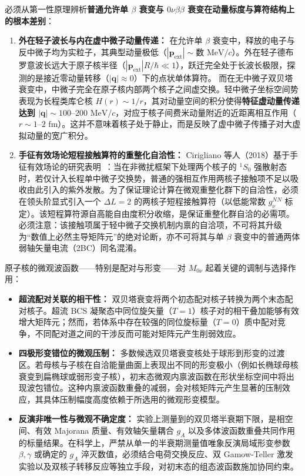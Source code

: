 必须从第一性原理辨析\textbf{普通允许单 $\beta$ 衰变与 $0\nu\beta\beta$ 衰变在动量标度与算符结构上的根本差别}：
\begin{enumerate}
\item \textbf{外在轻子波长与内在虚中微子动量传递：}
在允许单 $\beta$ 衰变中，释放的电子与反中微子均为实粒子，其典型动量极低（$|\mathbf{p}_{\mathrm{ext}}| \sim \text{数 MeV}/c$）。外在轻子德布罗意波长远大于原子核半径（$|\mathbf{p}_{\mathrm{ext}}| R / \hbar \ll 1$），跃迁完全处于长波长极限，探测的是接近零动量转移（$|\mathbf{q}| \approx 0$）下的点状单体算符。
而在无中微子双贝塔衰变中，中微子完全在原子核内部两个核子之间虚交换。轻中微子坐标空间势表现为长程类库仑核 $H(r) \sim 1/r$，其对动量空间的积分使得\textbf{特征虚动量传递达到 $|\mathbf{q}| \sim 100\text{--}200\text{ MeV}/c$}，对应于核子间费米动量附近的近距离相互作用（$r \sim 1\text{--}2\text{ fm}$）。这并不意味着核子处于静止，而是反映了虚中微子传播子对大虚拟动量的宽广积分。
\item \textbf{手征有效场论短程接触算符的重整化自洽性：}
Cirigliano 等人（2018）基于手征有效场论的研究表明~\cite{cirigliano-2018-leading-short-range-double-beta}：当在非微扰框架下处理两个核子的 $^1S_0$ 强散射态时，若仅计入长程单中微子交换势，普通的强相互作用两核子接触项不足以吸收由此引入的紫外发散。为了保证理论计算在微观重整化群下的自洽性，必须在领头阶显式引入一个 $\Delta L = 2$ 的两核子短程接触算符（以低能常数 $g_\nu^{NN}$ 标定）。该短程算符源自高能自由度积分收缩，是保证重整化群自洽的必需项。必须注意：该接触项属于轻中微子交换机制内禀的自洽项，不可将其升级为“数值上必然主导矩阵元”的绝对论断，亦不可将其与单 $\beta$ 衰变中的普通两体弱轴矢量电流（2BC）同名混淆。
\end{enumerate}

原子核的微观波函数——特别是配对与形变——对 $M_{0\nu}$ 起着关键的调制与选择作用：
\begin{itemize}
\item \textbf{超流配对关联的相干性：} 双贝塔衰变将两个初态配对核子转换为两个末态配对核子。超流 BCS 凝聚态中同位旋矢量（$T=1$）核子对的相干叠加能够有效增大矩阵元；然而，若体系中存在较强的同位旋标量（$T=0$）质中配对竞争，不同配对道之间的干涉反而可能对矩阵元产生削弱效应。
\item \textbf{四极形变错位的微观压制：} 多数候选双贝塔衰变核处于球形到形变的过渡区。若母核与子核在自洽能量曲面上表现出不同的形变极小（例如长椭球母核衰变到扁椭球或弱形变子核），初末态微观内禀波函数在形状坐标空间中将出现波包错位。这种内禀波函数重叠的减弱，会对核矩阵元产生显著的压制效应，其具体压制幅度高度依赖于所选用的微观形变模型。
\item \textbf{反演非唯一性与微观不确定度：} 实验上测量到的双贝塔半衰期下限，是相空间、有效 Majorana 质量、有效轴矢量耦合 $g_A$ 以及多体波函数重叠共同作用的标量结果。在科学上，严禁从单一的半衰期测量值唯象反演局域形变参数 $\beta, \gamma$ 或确定的 $g_A$ 淬灭数值，必须结合电荷交换反应、双 Gamow-Teller 激发实验以及双核子转移反应等独立手段，对初末态的组态波函数施加协同约束。
\end{itemize}

